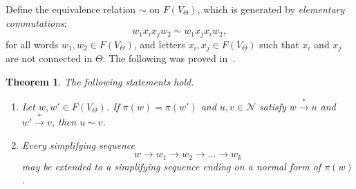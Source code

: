 \documentclass[pdflatex,sn-mathphys-num]{sn-jnl}
\newtheorem{theorem}{Theorem}[section]
\theoremstyle{definition}
\theoremstyle{remark}
\begin{document}
Define the equivalence relation $\sim$ on $F(V_{\Theta})$, which is generated by \emph{elementary commutations}:
\[
w_1 x_i x_j w_2 \sim w_1 x_j x_i w_2,
\]
for all words $w_1, w_2 \in F(V_{\Theta})$, and letters $x_i, x_j \in F(V_{\Theta})$ such that $x_i$ and $x_j$ are not connected in $\Theta$.
The following was proved in~\cite[Theorem 1]{aragona20}.
\begin{theorem}\label{normal:form}
   The following statements hold.
   \begin{enumerate}[label=(\roman*), ref=\roman*]
      \item\label{normal:form:i} Let $w, w' \in F(V_{\Theta})$. If $\pi(w) = \pi(w')$ and $u, v \in \mathcal{N}$ satisfy
         $w \overset{*}{\to} u$ and $w' \overset{*}{\to} v$, then $u \sim v$.
      \item\label{normal:form:ii} Every simplifying sequence 
      \[
      w \to w_1 \to w_2 \to \dots \to w_k
      \]
      may be extended to a simplifying sequence ending on a normal form of $\pi(w)$.
   \end{enumerate}
\end{theorem}
\end{document}
